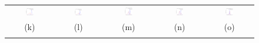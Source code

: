 \documentclass{IEEEtran}
\begin{document}
\begin{figure}[t]
\begin{tabular}{@{}c c c c c@{}}
\includegraphics[width=0.18\textwidth]{figs/synthetic/syn_lines_g2d_responses_cdf_0} &
\includegraphics[width=0.18\textwidth]{figs/synthetic/syn_lines_g2d_responses_cdf_1} &
\includegraphics[width=0.18\textwidth]{figs/synthetic/syn_lines_g2d_responses_cdf_2} &
\includegraphics[width=0.18\textwidth]{figs/synthetic/syn_lines_g2d_responses_cdf_3} &
\includegraphics[width=0.18\textwidth]{figs/retina/ret_vessels_g2d_responses_cdf}  \\
(k) & (l) & (m) & (n) & (o)\\
\noalign{\smallskip}


\end{tabular}
\end{figure}
\end{document}
